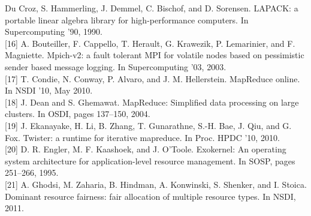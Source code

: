 \documentclass[
]{article}
\begin{document}
Du Croz, S. Hammerling, J. Demmel, C. Bischof, and D. Sorensen. LAPACK:
a portable linear algebra library for high-performance computers. In
Supercomputing '90, 1990.\\
{[}16{]} A. Bouteiller, F. Cappello, T. Herault, G. Krawezik, P.
Lemarinier, and F. Magniette. Mpich-v2: a fault tolerant MPI for
volatile nodes based on pessimistic sender based message logging. In
Supercomputing '03, 2003.\\
{[}17{]} T. Condie, N. Conway, P. Alvaro, and J. M. Hellerstein.
MapReduce online. In NSDI '10, May 2010.\\
{[}18{]} J. Dean and S. Ghemawat. MapReduce: Simplified data processing
on large clusters. In OSDI, pages 137--150, 2004.\\
{[}19{]} J. Ekanayake, H. Li, B. Zhang, T. Gunarathne, S.-H. Bae, J.
Qiu, and G. Fox. Twister: a runtime for iterative mapreduce. In Proc.
HPDC '10, 2010.\\
{[}20{]} D. R. Engler, M. F. Kaashoek, and J. O'Toole. Exokernel: An
operating system architecture for application-level resource management.
In SOSP, pages 251--266, 1995.\\
{[}21{]} A. Ghodsi, M. Zaharia, B. Hindman, A. Konwinski, S. Shenker,
and I. Stoica. Dominant resource fairness: fair allocation of multiple
resource types. In NSDI, 2011.
\end{document}
